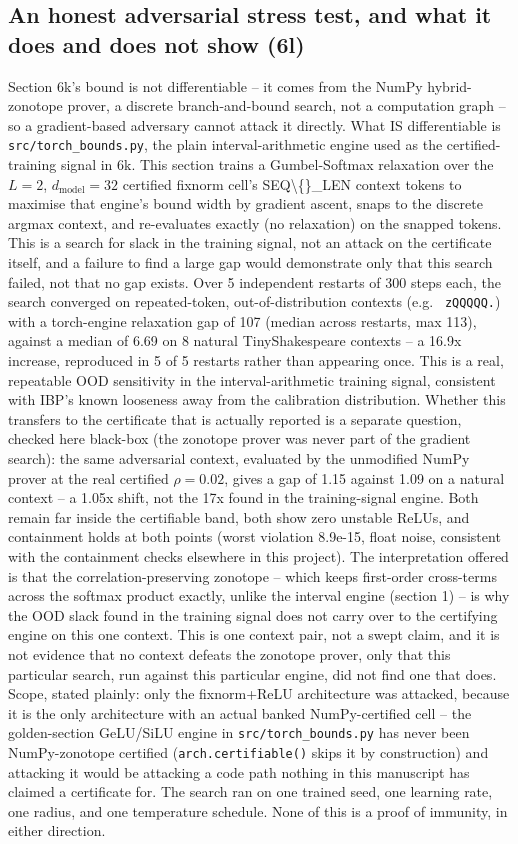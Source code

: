 \documentclass[sn-nature,pdflatex]{sn-jnl}
\begin{document}
\subsection{An honest adversarial stress test, and what it does and does not show (6l)}
Section 6k's bound is not differentiable -- it comes from the NumPy hybrid-zonotope prover, a discrete branch-and-bound search, not a computation graph -- so a gradient-based adversary cannot attack it directly. What IS differentiable is \texttt{src/torch\_bounds.py}, the plain interval-arithmetic engine used as the certified-training signal in 6k. This section trains a Gumbel-Softmax relaxation over the $L=2$, $d_{\text{model}}=32$ certified fixnorm cell's SEQ\textbackslash\{\}\_LEN context tokens to maximise that engine's bound width by gradient ascent, snaps to the discrete argmax context, and re-evaluates exactly (no relaxation) on the snapped tokens. This is a search for slack in the training signal, not an attack on the certificate itself, and a failure to find a large gap would demonstrate only that this search failed, not that no gap exists.
Over 5 independent restarts of 300 steps each, the search converged on repeated-token, out-of-distribution contexts (e.g. \texttt{ zQQQQQ.}) with a torch-engine relaxation gap of 107 (median across restarts, max 113), against a median of 6.69 on 8 natural TinyShakespeare contexts -- a 16.9x increase, reproduced in 5 of 5 restarts rather than appearing once. This is a real, repeatable OOD sensitivity in the interval-arithmetic training signal, consistent with IBP's known looseness away from the calibration distribution.
Whether this transfers to the certificate that is actually reported is a separate question, checked here black-box (the zonotope prover was never part of the gradient search): the same adversarial context, evaluated by the unmodified NumPy prover at the real certified $\rho=0.02$, gives a gap of 1.15 against 1.09 on a natural context -- a 1.05x shift, not the 17x found in the training-signal engine. Both remain far inside the certifiable band, both show zero unstable ReLUs, and containment holds at both points (worst violation 8.9e-15, float noise, consistent with the containment checks elsewhere in this project). The interpretation offered is that the correlation-preserving zonotope -- which keeps first-order cross-terms across the softmax product exactly, unlike the interval engine (section 1) -- is why the OOD slack found in the training signal does not carry over to the certifying engine on this one context. This is one context pair, not a swept claim, and it is not evidence that no context defeats the zonotope prover, only that this particular search, run against this particular engine, did not find one that does.
Scope, stated plainly: only the fixnorm+ReLU architecture was attacked, because it is the only architecture with an actual banked NumPy-certified cell -- the golden-section GeLU/SiLU engine in \texttt{src/torch\_bounds.py} has never been NumPy-zonotope certified (\texttt{arch.certifiable()} skips it by construction) and attacking it would be attacking a code path nothing in this manuscript has claimed a certificate for. The search ran on one trained seed, one learning rate, one radius, and one temperature schedule. None of this is a proof of immunity, in either direction.
\end{document}
